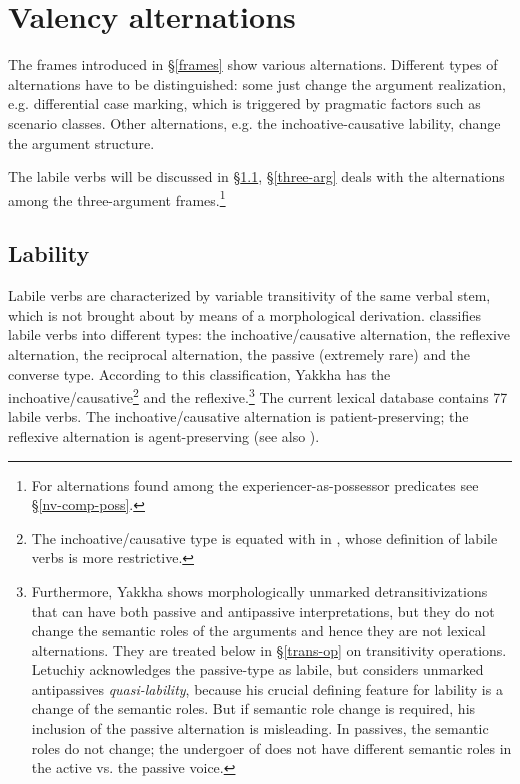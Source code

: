 \section{Valency alternations} \label{valclass}
 
The frames introduced in §\ref{frames} show various alternations.  Different types of alternations have to be distinguished: some just change the argument realization, e.g. differential case marking, which is triggered by pragmatic factors such as  scenario classes. Other alternations, e.g. the inchoative-causative lability, change the argument structure. 

The  labile verbs will be discussed  in §\ref{labile},  §\ref{three-arg}  deals with the alternations among the three-argument frames.\footnote{For alternations found among the experiencer-as-possessor predicates see §\ref{nv-comp-poss}.} 


\subsection{Lability}\label{labile}

Labile verbs are characterized by variable transitivity of the same verbal stem, which is not brought about by means of a morphological derivation. \citet[224]{Letuchiy2009Labile} classifies labile verbs  into different types: the inchoative/causative alternation, the reflexive alternation, the reciprocal alternation, the passive (extremely rare) and the converse type. According to this classification, Yakkha has the inchoative/causative\footnote{The inchoative/causative type is equated with  in \citet{Haspelmath1993More}, whose definition of labile verbs is more restrictive.} and the reflexive.\footnote{Furthermore, Yakkha shows morphologically unmarked detransitivizations that can have both passive and antipassive interpretations, but they do not change the semantic roles of the arguments and hence they are not lexical alternations. They are treated below in §\ref{trans-op} on transitivity operations. Letuchiy acknowledges the passive-type as labile, but considers unmarked antipassives \emph{quasi-lability}, because his crucial defining feature for lability is a change of the semantic roles. But if semantic role change is required, his inclusion of the passive alternation is misleading. In passives, the semantic roles do not change; the undergoer of  does not have different semantic roles in the active vs. the passive voice.} The current lexical database contains 77 labile verbs. The inchoative/causative alternation is patient-preserving; the reflexive alternation is agent-preserving (see also \citealt[223]{Letuchiy2009Labile}). 

